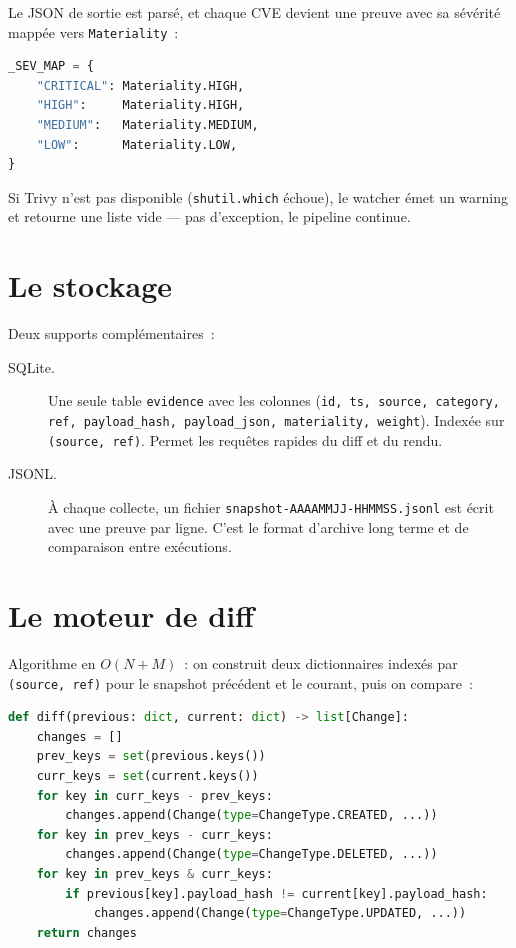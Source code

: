 Le JSON de sortie est parsé, et chaque CVE devient une preuve avec
sa sévérité mappée vers \texttt{Materiality}~:

\begin{lstlisting}[language=Python]
_SEV_MAP = {
    "CRITICAL": Materiality.HIGH,
    "HIGH":     Materiality.HIGH,
    "MEDIUM":   Materiality.MEDIUM,
    "LOW":      Materiality.LOW,
}
\end{lstlisting}

Si Trivy n'est pas disponible (\texttt{shutil.which} échoue), le
watcher émet un warning et retourne une liste vide --- pas
d'exception, le pipeline continue.

\section{Le stockage}

Deux supports complémentaires~:

\begin{description}
  \item[SQLite.] Une seule table \texttt{evidence} avec les
    colonnes (\texttt{id, ts, source, category, ref,
    payload\_hash, payload\_json, materiality, weight}). Indexée
    sur \texttt{(source, ref)}. Permet les requêtes rapides du
    diff et du rendu.
  \item[JSONL.] À chaque collecte, un fichier
    \texttt{snapshot-AAAAMMJJ-HHMMSS.jsonl} est écrit avec une
    preuve par ligne. C'est le format d'archive long terme et
    de comparaison entre exécutions.
\end{description}

\section{Le moteur de diff}

Algorithme en $O(N+M)$~: on construit deux dictionnaires indexés
par \texttt{(source, ref)} pour le snapshot précédent et le
courant, puis on compare~:

\begin{lstlisting}[language=Python,caption={Logique de diff.}]
def diff(previous: dict, current: dict) -> list[Change]:
    changes = []
    prev_keys = set(previous.keys())
    curr_keys = set(current.keys())
    for key in curr_keys - prev_keys:
        changes.append(Change(type=ChangeType.CREATED, ...))
    for key in prev_keys - curr_keys:
        changes.append(Change(type=ChangeType.DELETED, ...))
    for key in prev_keys & curr_keys:
        if previous[key].payload_hash != current[key].payload_hash:
            changes.append(Change(type=ChangeType.UPDATED, ...))
    return changes
\end{lstlisting}


